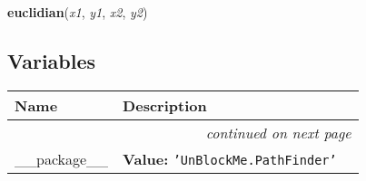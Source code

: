 \hspace{.8\funcindent}\begin{boxedminipage}{\funcwidth}

    \raggedright \textbf{euclidian}(\textit{x1}, \textit{y1}, \textit{x2}, \textit{y2})

\setlength{\parskip}{2ex}
\setlength{\parskip}{1ex}
    \end{boxedminipage}



  \subsection{Variables}

    \vspace{-1cm}
\hspace{\varindent}\begin{longtable}{|p{\varnamewidth}|p{\vardescrwidth}|l}
\cline{1-2}
\cline{1-2} \centering \textbf{Name} & \centering \textbf{Description}& \\
\cline{1-2}
\endhead\cline{1-2}\multicolumn{3}{r}{\small\textit{continued on next page}}\\\endfoot\cline{1-2}
\endlastfoot\raggedright \_\-\_\-p\-a\-c\-k\-a\-g\-e\-\_\-\_\- & \raggedright \textbf{Value:} 
{\tt \texttt{'}\texttt{UnBlockMe.PathFinder}\texttt{'}}&\\
\cline{1-2}
\end{longtable}

